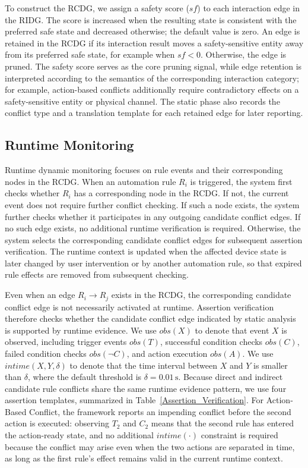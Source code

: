 To construct the RCDG, we assign a safety score ($sf$) to each interaction edge in the RIDG. The score is increased when the resulting state is consistent with the preferred safe state and decreased otherwise; the default value is zero. An edge is retained in the RCDG if its interaction result moves a safety-sensitive entity away from its preferred safe state, for example when $sf<0$. Otherwise, the edge is pruned. The safety score serves as the core pruning signal, while edge retention is interpreted according to the semantics of the corresponding interaction category; for example, action-based conflicts additionally require contradictory effects on a safety-sensitive entity or physical channel. The static phase also records the conflict type and a translation template for each retained edge for later reporting.

\subsection{Runtime Monitoring}

Runtime dynamic monitoring focuses on rule events and their corresponding nodes in the RCDG. When an automation rule $R_i$ is triggered, the system first checks whether $R_i$ has a corresponding node in the RCDG. If not, the current event does not require further conflict checking. If such a node exists, the system further checks whether it participates in any outgoing candidate conflict edges. If no such edge exists, no additional runtime verification is required. Otherwise, the system selects the corresponding candidate conflict edges for subsequent assertion verification. The runtime context is updated when the affected device state is later changed by user intervention or by another automation rule, so that expired rule effects are removed from subsequent checking.

Even when an edge $R_i \rightarrow R_j$ exists in the RCDG, the corresponding candidate conflict edge is not necessarily activated at runtime. Assertion verification therefore checks whether the candidate conflict edge indicated by static analysis is supported by runtime evidence. We use $obs(X)$ to denote that event $X$ is observed, including trigger events $obs(T)$, successful condition checks $obs(C)$, failed condition checks $obs(\neg C)$, and action execution $obs(A)$. We use $intime(X,Y,\delta)$ to denote that the time interval between $X$ and $Y$ is smaller than $\delta$, where the default threshold is $\delta = 0.01\,\mathrm{s}$. Because direct and indirect candidate rule conflicts share the same runtime evidence pattern, we use four assertion templates, summarized in Table~\ref{Assertion_Verification}. For Action-Based Conflict, the framework reports an impending conflict before the second action is executed: observing $T_2$ and $C_2$ means that the second rule has entered the action-ready state, and no additional $intime(\cdot)$ constraint is required because the conflict may arise even when the two actions are separated in time, as long as the first rule's effect remains valid in the current runtime context.


